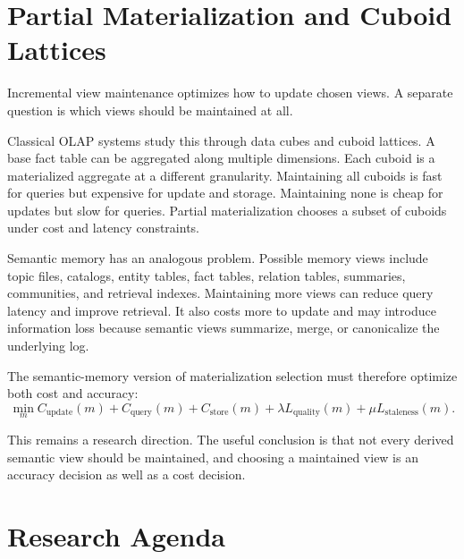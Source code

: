 \documentclass[11pt]{article}
\begin{document}
\section{Partial Materialization and Cuboid Lattices}

Incremental view maintenance optimizes how to update chosen views. A separate
question is which views should be maintained at all.

Classical OLAP systems study this through data cubes and cuboid lattices. A
base fact table can be aggregated along multiple dimensions. Each cuboid is a
materialized aggregate at a different granularity. Maintaining all cuboids is
fast for queries but expensive for update and storage. Maintaining none is cheap
for updates but slow for queries. Partial materialization chooses a subset of
cuboids under cost and latency constraints.

Semantic memory has an analogous problem. Possible memory views include topic
files, catalogs, entity tables, fact tables, relation tables, summaries,
communities, and retrieval indexes. Maintaining more views can reduce query
latency and improve retrieval. It also costs more to update and may introduce
information loss because semantic views summarize, merge, or canonicalize the
underlying log.

The semantic-memory version of materialization selection must therefore optimize
both cost and accuracy:
\[
  \min_m
  C_{\mathrm{update}}(m)
  + C_{\mathrm{query}}(m)
  + C_{\mathrm{store}}(m)
  + \lambda L_{\mathrm{quality}}(m)
  + \mu L_{\mathrm{staleness}}(m).
\]

This remains a research direction. The useful conclusion is that not every
derived semantic view should be maintained, and choosing a maintained view is
an accuracy decision as well as a cost decision.

\section{Research Agenda}
\end{document}
